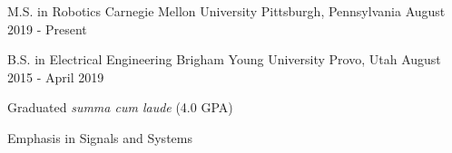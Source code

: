 

\begin{cventries}


  \scventry
    {M.S. in Robotics} %
    {Carnegie Mellon University} %
    {Pittsburgh, Pennsylvania} %
    {August 2019 - Present} %
    
  \cventry
    {B.S. in Electrical Engineering} %
    {Brigham Young University} %
    {Provo, Utah} %
    {August 2015 - April 2019} %
    {
      \begin{cvitems}
        \item {Graduated \textit{summa cum laude} (4.0 GPA)}
        \item {Emphasis in Signals and Systems}
      \end{cvitems}
    }

  

\end{cventries}
